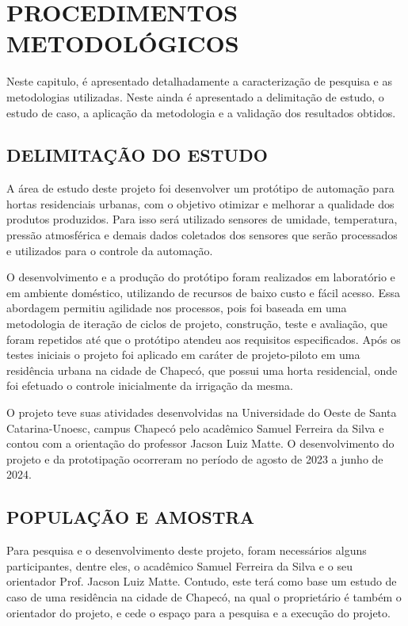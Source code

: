 \documentclass[%
  article,%
  a4paper,%
  12pt,%
  fleqn,%
  oneside,%
  chapter = TITLE,%
  section = TITLE,%
]{abntex2}
\begin{document}
\section{PROCEDIMENTOS METODOLÓGICOS}\label{sec:metod}

Neste capitulo, é apresentado detalhadamente a caracterização de pesquisa e as metodologias utilizadas. Neste ainda é apresentado a delimitação de estudo, o estudo de caso, a aplicação da metodologia e a validação dos resultados obtidos.
  
\subsection{DELIMITAÇÃO DO ESTUDO}
A área de estudo deste projeto foi desenvolver um protótipo de automação para hortas residenciais urbanas, com o objetivo otimizar e melhorar a qualidade dos produtos produzidos. Para isso será utilizado sensores de umidade, temperatura, pressão atmosférica e demais dados coletados dos sensores que serão processados e utilizados para o controle da automação.

O desenvolvimento e a produção do protótipo foram realizados em laboratório e em ambiente doméstico, utilizando de recursos de baixo custo e fácil acesso. Essa abordagem permitiu agilidade nos processos, pois foi baseada em uma metodologia de iteração de ciclos de projeto, construção, teste e avaliação, que foram repetidos até que o protótipo atendeu aos requisitos especificados. Após os testes iniciais o projeto foi aplicado em caráter de projeto-piloto em uma residência urbana na cidade de Chapecó, que possui uma horta residencial, onde foi efetuado o controle inicialmente da irrigação da mesma.

O projeto teve suas atividades desenvolvidas na Universidade do Oeste de Santa Catarina-Unoesc, campus Chapecó pelo acadêmico Samuel Ferreira da Silva e contou com a orientação do professor Jacson Luiz Matte. O desenvolvimento do projeto e da prototipação ocorreram no período de agosto de 2023 a junho de 2024. 

 
\subsection{POPULAÇÃO E AMOSTRA}

Para pesquisa e o desenvolvimento deste projeto, foram necessários alguns participantes, dentre eles, o acadêmico Samuel Ferreira da Silva e o seu orientador Prof. Jacson Luiz Matte. Contudo, este terá como base um estudo de caso de uma residência na cidade de Chapecó, na qual o proprietário é também o orientador do projeto, e cede o espaço para a pesquisa e a execução do projeto.
\end{document}
